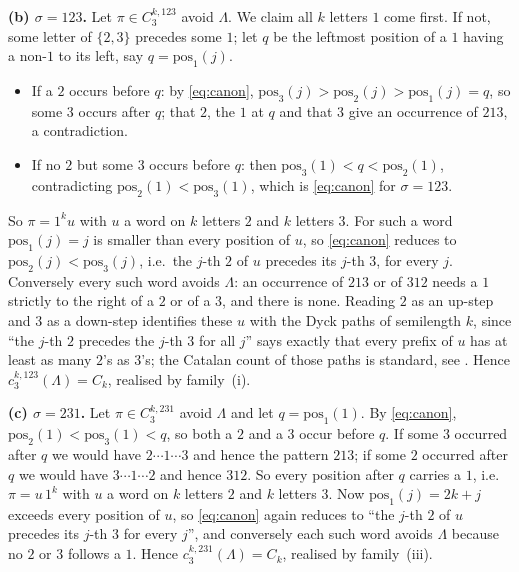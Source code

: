 \documentclass[11pt]{amsart}
\theoremstyle{definition}
\newcommand{\Cat}{C}
\begin{document}
\smallskip\noindent
\textbf{(b) $\sigma=123$.}
Let $\pi\in C_3^{k,123}$ avoid $\Lambda$. We claim all $k$ letters $1$ come
first. If not, some letter of $\{2,3\}$ precedes some $1$; let $q$ be the
leftmost position of a $1$ having a non-$1$ to its left, say
$q=\mathrm{pos}_1(j)$.
\begin{itemize}
\item If a $2$ occurs before $q$: by \eqref{eq:canon},
      $\mathrm{pos}_3(j)>\mathrm{pos}_2(j)>\mathrm{pos}_1(j)=q$, so some $3$
      occurs after $q$; that $2$, the $1$ at $q$ and that $3$ give an
      occurrence of $213$, a contradiction.
\item If no $2$ but some $3$ occurs before $q$: then
      $\mathrm{pos}_3(1)<q<\mathrm{pos}_2(1)$, contradicting
      $\mathrm{pos}_2(1)<\mathrm{pos}_3(1)$, which is \eqref{eq:canon} for
      $\sigma=123$.
\end{itemize}
So $\pi=1^ku$ with $u$ a word on $k$ letters $2$ and $k$ letters $3$. For such
a word $\mathrm{pos}_1(j)=j$ is smaller than every position of $u$, so
\eqref{eq:canon} reduces to $\mathrm{pos}_2(j)<\mathrm{pos}_3(j)$, i.e.\ the
$j$-th $2$ of $u$ precedes its $j$-th $3$, for every $j$. Conversely every such
word avoids $\Lambda$: an occurrence of $213$ or of $312$ needs a $1$ strictly
to the right of a $2$ or of a $3$, and there is none. Reading $2$ as an up-step
and $3$ as a down-step identifies these $u$ with the Dyck paths of semilength
$k$, since ``the $j$-th $2$ precedes the $j$-th $3$ for all $j$'' says exactly
that every prefix of $u$ has at least as many $2$'s as $3$'s; the Catalan count
of those paths is standard, see \cite{Stanley}. Hence
$c_3^{k,123}(\Lambda)=\Cat_k$, realised by family~(i).

\smallskip\noindent
\textbf{(c) $\sigma=231$.}
Let $\pi\in C_3^{k,231}$ avoid $\Lambda$ and let $q=\mathrm{pos}_1(1)$. By
\eqref{eq:canon}, $\mathrm{pos}_2(1)<\mathrm{pos}_3(1)<q$, so both a $2$ and a
$3$ occur before $q$. If some $3$ occurred after $q$ we would have
$2\cdots1\cdots3$ and hence the pattern $213$; if some $2$ occurred after $q$
we would have $3\cdots1\cdots2$ and hence $312$. So every position after $q$
carries a $1$, i.e.\ $\pi=u\,1^k$ with $u$ a word on $k$ letters $2$ and $k$
letters $3$. Now $\mathrm{pos}_1(j)=2k+j$ exceeds every position of $u$, so
\eqref{eq:canon} again reduces to ``the $j$-th $2$ of $u$ precedes its $j$-th
$3$ for every $j$'', and conversely each such word avoids $\Lambda$ because no
$2$ or $3$ follows a $1$. Hence $c_3^{k,231}(\Lambda)=\Cat_k$, realised by
family~(iii).
\end{document}
